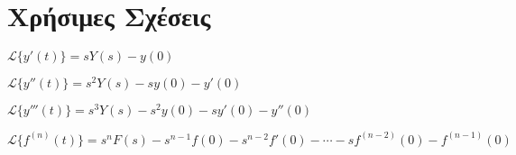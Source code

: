 \section*{Χρήσιμες Σχέσεις}
\centering
\begin{myitemize}
  \item $ \mathcal{L}\{y'(t)\} = sY(s) - y(0) $
  \item $ \mathcal{L}\{y''(t)\} = s^{2}Y(s) - sy(0) - y'(0) $
  \item $ \mathcal{L}\{y'''(t)\} = s^{3}Y(s) - s^{2}y(0) - sy'(0) - y''(0) $
  \item $ \mathcal{L}\{f^{(n)}(t)\} = s^{n} F(s) - s^{n-1}f(0) - s^{n-2}f'(0) - 
    \cdots - sf^{(n-2)}(0)- f^{(n-1)}(0) $
\end{myitemize}



